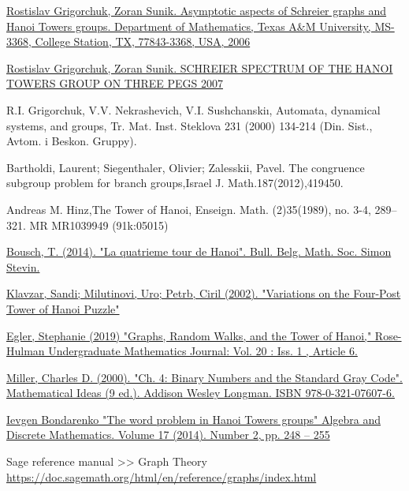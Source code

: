 \documentclass[a4paper,12pt]{amsart}
\begin{document}
\begin{thebibliography}{9}
	\href{https://arxiv.org/abs/math/0601592}{Rostislav Grigorchuk, Zoran Sunik. Asymptotic aspects of Schreier graphs and Hanoi Towers groups. Department of Mathematics, Texas A\&M University, MS-3368, College Station, TX, 77843-3368, USA, 2006}
	
	\href{https://arxiv.org/abs/0711.0068}{Rostislav Grigorchuk, Zoran Sunik. SCHREIER SPECTRUM OF THE HANOI TOWERS GROUP ON THREE PEGS 2007}
	
	R.I. Grigorchuk, V.V. Nekrashevich, V.I. Sushchanskiı, Automata, dynamical systems, and groups, Tr. Mat. Inst. Steklova 231 (2000) 134-214
	(Din. Sist., Avtom. i Beskon. Gruppy).
	
	Bartholdi, Laurent; Siegenthaler, Olivier; Zalesskii, Pavel. The congruence subgroup problem for branch groups,Israel  J.  Math.187(2012),419450.
	
	 Andreas M. Hinz,The Tower of Hanoi, Enseign. Math. (2)35(1989),
	no. 3-4, 289–321. MR MR1039949 (91k:05015)
	
	 \href{https://web.archive.org/web/20170921001150/https://pdfs.semanticscholar.org/fb87/0a772baf96a2e11901122a2b04c3dd25596d.pdf}{Bousch, T. (2014). "La quatrieme tour de Hanoi". Bull. Belg. Math. Soc. Simon Stevin. }
	
	 \href{https://core.ac.uk/download/pdf/81954097.pdf}{Klavzar, Sandi; Milutinovi, Uro; Petrb, Ciril (2002). "Variations on the Four-Post Tower of Hanoi Puzzle"}
	
	\href{https://scholar.rose-hulman.edu/rhumj/vol20/iss1/6}{Egler, Stephanie (2019) "Graphs, Random Walks, and the Tower of Hanoi," Rose-Hulman Undergraduate Mathematics Journal: Vol. 20 : Iss. 1 , Article 6.}
	
	\href{https://web.archive.org/web/20040821062630/http://occawlonline.pearsoned.com/bookbind/pubbooks/miller2_awl/chapter4/essay1/deluxe-content.html}{Miller, Charles D. (2000). "Ch. 4: Binary Numbers and the Standard Gray Code". Mathematical Ideas (9 ed.). Addison Wesley Longman. ISBN 978-0-321-07607-6.}
	
	\href {https://arxiv.org/abs/1409.0119}{Ievgen Bondarenko "The word problem in Hanoi Towers groups" Algebra and Discrete Mathematics. Volume 17 (2014). Number 2, pp. 248 – 255}
	
	Sage reference manual >> Graph Theory \url{https://doc.sagemath.org/html/en/reference/graphs/index.html}
	

\end{thebibliography}
\end{document}
